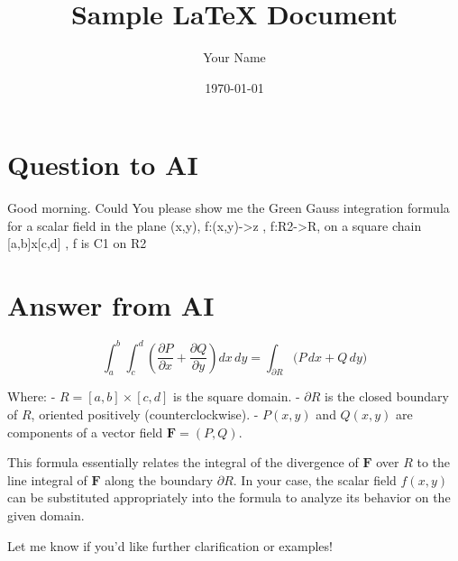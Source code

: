 \documentclass{article}
\title{Sample LaTeX Document}
\author{Your Name}
\date{\today}
\begin{document}
\maketitle

\section{Question to AI}
Good morning. Could You please show me the Green Gauss integration formula for a scalar field in the plane (x,y), f:(x,y)->z , f:R2->R, on a square chain [a,b]x[c,d] , f is C1 on R2


\section{Answer from AI}

\[
\int_{a}^{b}\int_{c}^{d} \left( \frac{\partial P}{\partial x} + \frac{\partial Q}{\partial y} \right) dx \, dy = \int_{\partial R} \big( P \, dx + Q \, dy \big)
\]

Where:
- \( R = [a,b] \times [c,d] \) is the square domain.
- \( \partial R \) is the closed boundary of \( R \), oriented positively (counterclockwise).
- \( P(x, y) \) and \( Q(x, y) \) are components of a vector field \( \mathbf{F} = (P, Q) \).

This formula essentially relates the integral of the divergence of \( \mathbf{F} \) over \( R \) to the line integral of \( \mathbf{F} \) along the boundary \( \partial R \). In your case, the scalar field \( f(x,y) \) can be substituted appropriately into the formula to analyze its behavior on the given domain.

Let me know if you’d like further clarification or examples!
\end{document}
